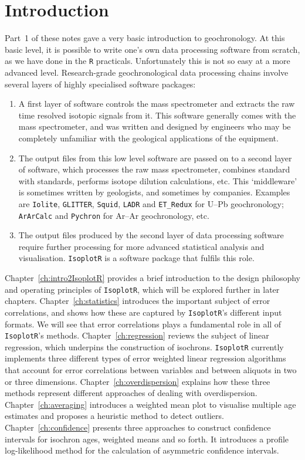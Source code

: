 \chapter{Introduction}
\label{ch:intro2}

Part~1 of these notes gave a very basic introduction to geochronology.
At this basic level, it is possible to write one's own data processing
software from scratch, as we have done in the \texttt{R} practicals.
Unfortunately this is not so easy at a more advanced level.
Research-grade geochronological data processing chains involve several
layers of highly specialised software packages:

\begin{enumerate}
\item A first layer of software controls the mass spectrometer and
  extracts the raw time resolved isotopic signals from it. This
  software generally comes with the mass spectrometer, and was written
  and designed by engineers who may be completely unfamiliar with the
  geological applications of the equipment.
\item The output files from this low level software are passed on to a
  second layer of software, which processes the raw mass spectrometer,
  combines standard with standards, performs isotope dilution
  calculations, etc. This `middleware' is sometimes written by
  geologists, and sometimes by companies. Examples are
  \texttt{Iolite}, \texttt{GLITTER}, \texttt{Squid}, \texttt{LADR} and
  \texttt{ET\_Redux} for U--Pb geochronology; \texttt{ArArCalc} and
  \texttt{Pychron} for Ar--Ar geochronology, etc.
\item The output files produced by the second layer of data processing
  software require further processing for more advanced statistical
  analysis and visualisation. \texttt{IsoplotR} is a software package
  that fulfils this role.
\end{enumerate}

Chapter~\ref{ch:intro2IsoplotR} provides a brief introduction to the
design philosophy and operating principles of \texttt{IsoplotR}, which
will be explored further in later chapters.
Chapter~\ref{ch:statistics} introduces the important subject of error
correlations, and shows how these are captured by \texttt{IsoplotR}'s
different input formats.  We will see that error correlations plays a
fundamental role in all of \texttt{IsoplotR}'s methods.
Chapter~\ref{ch:regression} reviews the subject of linear regression,
which underpins the construction of isochrons. \texttt{IsoplotR}
currently implements three different types of error weighted linear
regression algorithms that account for error correlations between
variables and between aliquots in two or three dimensions.
Chapter~\ref{ch:overdispersion} explains how these three methods
represent different approaches of dealing with overdispersion.
Chapter~\ref{ch:averaging} introduces a weighted mean plot to
visualise multiple age estimates and proposes a heuristic method to
detect outliers.  Chapter~\ref{ch:confidence} presents three
approaches to construct confidence intervals for isochron ages,
weighted means and so forth.  It introduces a profile log-likelihood
method for the calculation of asymmetric confidence intervals.\\

